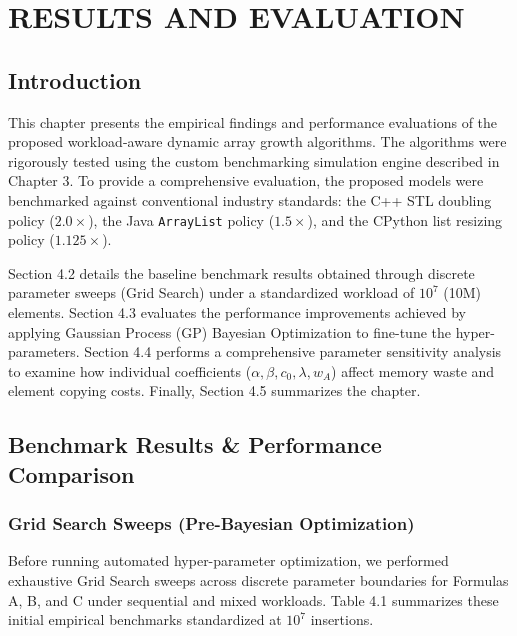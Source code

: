 \chapter{RESULTS AND EVALUATION}

\section{Introduction}
This chapter presents the empirical findings and performance evaluations of the 
proposed workload-aware dynamic array growth algorithms. The algorithms were 
rigorously tested using the custom benchmarking simulation engine described in 
Chapter 3. To provide a comprehensive evaluation, the proposed models were 
benchmarked against conventional industry standards: the C++ STL doubling policy 
($2.0\times$), the Java \texttt{ArrayList} policy ($1.5\times$), and the CPython 
list resizing policy ($1.125\times$). 

Section 4.2 details the baseline benchmark results obtained through discrete 
parameter sweeps (Grid Search) under a standardized workload of $10^7$ (10M) 
elements. Section 4.3 evaluates the performance improvements achieved by 
applying Gaussian Process (GP) Bayesian Optimization to fine-tune the 
hyper-parameters. Section 4.4 performs a comprehensive parameter sensitivity 
analysis to examine how individual coefficients ($\alpha, \beta, c_0, \lambda, w_A$) 
affect memory waste and element copying costs. Finally, Section 4.5 summarizes 
the chapter.

\section{Benchmark Results \& Performance Comparison}

\subsection{Grid Search Sweeps (Pre-Bayesian Optimization)}
Before running automated hyper-parameter optimization, we performed exhaustive 
Grid Search sweeps across discrete parameter boundaries for Formulas A, B, and C 
under sequential and mixed workloads. Table 4.1 summarizes these initial 
empirical benchmarks standardized at $10^7$ insertions.

